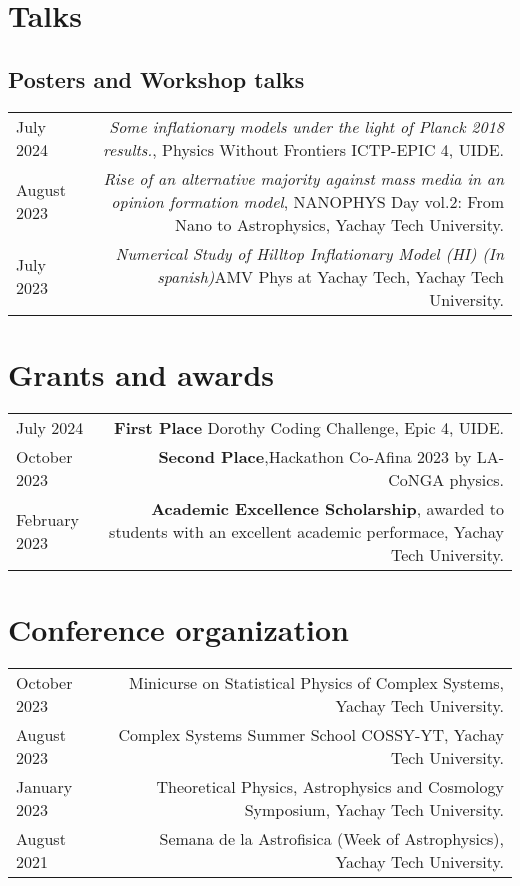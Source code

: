 \documentclass{article}
\begin{document}
\section*{Talks}
\subsection*{Posters and Workshop talks}
\begin{tabular}{L!{\vrule}R}

    July 2024 & \textit{Some inflationary models under the light of Planck 2018 results.}, Physics Without Frontiers ICTP-EPIC 4, UIDE. \\

    August 2023 & \textit{Rise of an alternative majority against mass media in an opinion formation model}, NANOPHYS Day vol.2: From Nano to Astrophysics, Yachay Tech University. \\

    July 2023 & \textit{Numerical Study of Hilltop Inflationary Model (HI) (In spanish)}AMV Phys at Yachay Tech, Yachay Tech University. \\

    

\end{tabular}


\section*{Grants and awards}

\begin{tabular}{L!{\vrule}R}
    July 2024 & \textbf{First Place} Dorothy Coding Challenge, Epic 4, UIDE. \\
    October 2023 & \textbf{Second Place},Hackathon Co-Afina 2023 by LA-CoNGA physics. \\
    February 2023 & \textbf{Academic Excellence Scholarship}, awarded to students with an excellent academic performace, Yachay Tech University. \\
    
\end{tabular}


\section*{Conference organization}

\begin{tabular}{L!{\vrule}R}
  October 2023  & Minicurse on Statistical Physics of Complex Systems, Yachay Tech University. \\
  August 2023  & Complex Systems Summer School COSSY-YT, Yachay Tech University. \\
  January 2023 & Theoretical Physics, Astrophysics and Cosmology Symposium, Yachay Tech University.\\
  August 2021 & Semana de la Astrofisica (Week of Astrophysics), Yachay Tech University.\\
\end{tabular}
\end{document}
